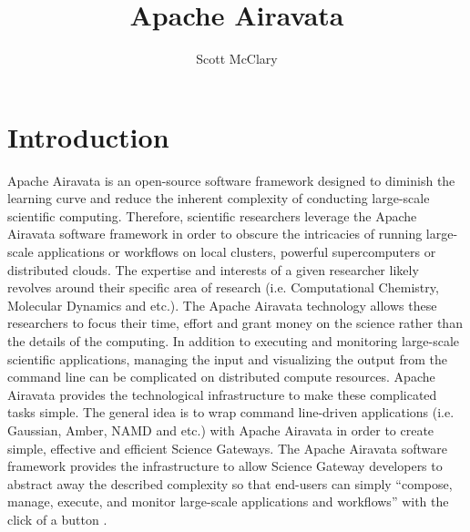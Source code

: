 \documentclass[9pt,twocolumn,twoside]{styles/osajnl}
\title{Apache Airavata}
\author[1,*]{Scott McClary}
\affil[1]{School of Informatics and Computing, Bloomington, IN 47408, U.S.A.}
\affil[*]{Corresponding authors: scmcclar@indiana.edu}
\begin{document}
\maketitle

\section{Introduction} \label{introduction}
Apache Airavata is an open-source software framework designed to
diminish the learning curve and reduce the inherent complexity of
conducting large-scale scientific computing. Therefore, scientific
researchers leverage the Apache Airavata software framework in order
to obscure the intricacies of running large-scale applications or
workflows on local clusters, powerful supercomputers or distributed
clouds. The expertise and interests of a given researcher likely
revolves around their specific area of research (i.e. Computational
Chemistry, Molecular Dynamics and etc.). The Apache Airavata
technology allows these researchers to focus their time, effort and
grant money on the science rather than the details of the
computing. In addition to executing and monitoring large-scale
scientific applications, managing the input and visualizing the output
from the command line can be complicated on distributed compute
resources. Apache Airavata provides the technological infrastructure
to make these complicated tasks simple. The general idea is to wrap
command line-driven applications (i.e. Gaussian, Amber, NAMD and etc.)
with Apache Airavata in order to create simple, effective and
efficient Science Gateways. The Apache Airavata software framework
provides the infrastructure to allow Science Gateway developers to
abstract away the described complexity so that end-users can simply
``compose, manage, execute, and monitor large-scale applications and
workflows'' with the click of a button \cite{www-airavata}.
\end{document}

